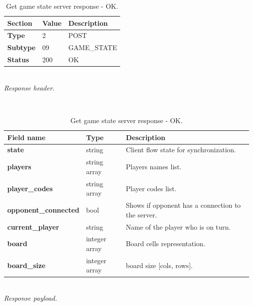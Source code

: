 \documentclass[english, sem, kiv, he, iso690alph, pdf, viewonly]{fasthesis}
\begin{document}
\begin{table}[h!]
	\centering
	\begin{minipage}[b]{1.0\textwidth}
		\centering
		\begin{tabular}{|l|l|l|}
			\hline
			\textbf{Section} & \textbf{Value} & \textbf{Description} \\ \hline
			\textbf{Type} & 2 & \footnotesize{POST} \\ \hline
			\textbf{Subtype} & 09 & \footnotesize{GAME\_STATE}  \\ \hline
			\textbf{Status} & 200 & \footnotesize{OK} \\ \hline
		\end{tabular} \\
		\textit{Response header.}
	\end{minipage} 
	\\
	\vspace{10pt}
	\begin{minipage}[b]{1.0\textwidth}
		\centering
		\begin{tabular}{|l|l|l|}
			\hline
			\textbf{Field name} & \textbf{Type} & \textbf{Description} \\ \hline
			\textbf{state} & string & Client flow state for synchronization. \\ \hline
            \textbf{players} & string array & Players names list. \\ \hline
            \textbf{player\_codes} & string array & Player codes list. \\ \hline
            \textbf{opponent\_connected} & bool & Shows if opponent has a connection to the server. \\ \hline
            \textbf{current\_player} & string & Name of the player who is on turn. \\ \hline
            \textbf{board} & integer array & Board cells representation. \\ \hline
            \textbf{board\_size} & integer array & board size [cols, rows]. \\ \hline
		\end{tabular} \\
		\textit{Response payload.}
	\end{minipage}	
	\caption{Get game state server response - OK.}
	\label{tab:get_game_state_response_ok}
\end{table}

\newpage
\end{document}
